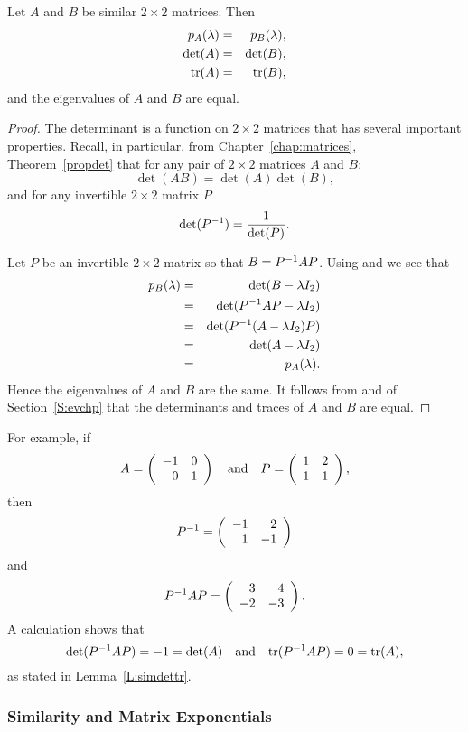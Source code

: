 \documentclass{ximera}
\begin{document}
\begin{lemma}  \label{L:simdettr}
Let $A$ and $B$ be similar $2\times 2$ matrices.  Then
\begin{eqnarray*}
p_A(\lambda) & = & p_B(\lambda),\\
\det(A) & = & \det(B),\\
{\rm tr}(A) & = & {\rm tr}(B),
\end{eqnarray*} 
and the eigenvalues of $A$ and $B$ are equal.
\end{lemma}

\begin{proof}
The determinant is a function on $2\times 2$ matrices
that has several important properties.  Recall, in particular, from
Chapter~\ref{chap:matrices}, Theorem~\ref{propdet} that for any pair of
$2\times 2$ matrices $A$ and $B$:
\begin{equation} \label{e:detprod}
\det(AB) =  \det(A)\det(B),
\end{equation}
and for any invertible $2\times 2$ matrix $P$
\begin{equation}  \label{e:detinv}
\det(P^{-1})  =  \frac{1}{\det(P)}.
\end{equation}

Let $P$ be an invertible $2\times 2$ matrix so that $B=P^{-1} AP$.
Using  and  we see that
\begin{eqnarray*}
p_B(\lambda) & = & \det(B-\lambda I_2) \\
 & = & \det(P^{-1} AP-\lambda I_2) \\
& = & \det(P^{-1}(A-\lambda I_2)P) \\
& = & \det(A-\lambda I_2) \\
& = & p_A(\lambda).
\end{eqnarray*}
Hence the eigenvalues of $A$ and $B$ are the same.  It follows
from  and  of Section~\ref{S:evchp}
that the determinants and traces of $A$ and $B$ are equal.   \end{proof}

For example, if
\[
A = \left(\begin{array}{rr} -1 & 0\\ 0 &1\end{array}\right) \quad\mbox{and}\quad  P = \left(\begin{array}{rr} 1 & 2\\ 1 &1\end{array}\right),
\]
then
\[
P^{-1} = \left(\begin{array}{rr} -1 & 2\\ 1 &-1\end{array}\right)
\]
and
\[
P^{-1} AP = \left(\begin{array}{rr} 3 & 4\\ -2 &-3\end{array}\right).
\]
A calculation shows that
\[
\det(P^{-1} AP)=-1=\det(A) \quad\mbox{and}\quad {\rm tr}(P^{-1} AP)=0={\rm tr}(A),
\]
as stated in Lemma~\ref{L:simdettr}.


\subsubsection*{Similarity and Matrix Exponentials}
\end{document}
